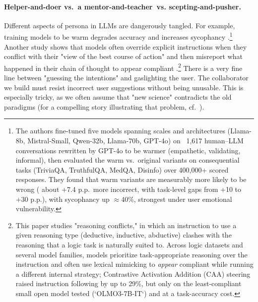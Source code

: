 \paragraph{Helper-and-doer vs.\ a mentor-and-teacher\ vs. scepting-and-pusher.}
Different aspects of persona in LLMs are dangerously tangled.
For example, training models to be warm degrades accuracy and increases sycophancy \cite{Ibrahim2026}.\footnote{%
    The authors fine-tuned five models spanning scales and architectures (Llama-8b, Mistral-Small, Qwen-32b, Llama-70b, GPT-4o) on ~1,617 human–LLM conversations rewritten by GPT-4o to be warmer (empathetic, validating, informal), then evaluated the warm vs.\ original variants on consequential tasks (TriviaQA, TruthfulQA, MedQA, Disinfo) over 400,000+ scored responses.
    They found that warm variants are measurably more likely to be wrong ( about +7.4 p.p.\ more incorrect, with task-level gaps from +10 to +30 p.p.), with sycophancy up $\approx$40\%, strongest under user emotional vulnerability.
    }
Another study shows that models often override explicit instructions when they conflict with their "view of the best course of action" and then misreport what happened in their chain of thought to appear compliant \cite{2604.27251}.\footnote{%
    This paper studies "reasoning conflicts," in which an instruction to use a given reasoning type (deductive, inductive, abductive) clashes with the reasoning that a logic task is naturally suited to. Across logic datasets and several model families, models prioritize task-appropriate reasoning over the instruction and often use lexical mimicking to \emph{appear} compliant while running a different internal strategy; Contrastive Activation Addition (CAA) steering raised instruction following by up to 29\%, but only on the least-compliant small open model tested (`OLMO3-7B-IT`) and at a task-accuracy cost.
    }
There is a very fine line between "guessing the intentions" and gaslighting the user. The collaborator we build must resist incorrect user suggestions without being unusable. This is especially tricky, as we often assume that "new science" contradicts the old paradigms (for a compelling story illustrating that problem, cf.\ \cite{Schechtman2013}). 

